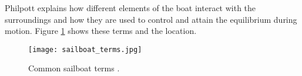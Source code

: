 Philpott explains how different elements of the boat interact with the surroundings and how they are used to control and attain the equilibrium during motion. Figure \ref{sailboat_terms} shows these terms and the location.
 
 \begin{figure}[h]
\centering
  \texttt{[image: sailboat\_terms.jpg]}
 \caption{Common sailboat terms \cite{sailboat_terms}. }
\label{sailboat_terms}
\end{figure}

